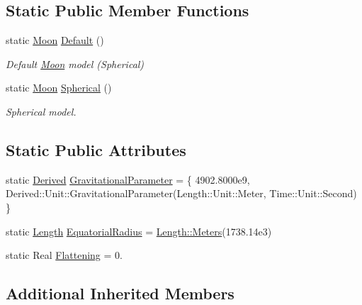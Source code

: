 \subsection*{Static Public Member Functions}
\begin{DoxyCompactItemize}
\item 
static \hyperlink{classostk_1_1physics_1_1env_1_1obj_1_1celest_1_1_moon}{Moon} \hyperlink{classostk_1_1physics_1_1env_1_1obj_1_1celest_1_1_moon_a20b7b36974130f942a113b05c4544a03}{Default} ()
\begin{DoxyCompactList}\small\item\em Default \hyperlink{classostk_1_1physics_1_1env_1_1obj_1_1celest_1_1_moon}{Moon} model (Spherical) \end{DoxyCompactList}\item 
static \hyperlink{classostk_1_1physics_1_1env_1_1obj_1_1celest_1_1_moon}{Moon} \hyperlink{classostk_1_1physics_1_1env_1_1obj_1_1celest_1_1_moon_a88731f2b1fde53140ce68d004f2a8aa9}{Spherical} ()
\begin{DoxyCompactList}\small\item\em Spherical model. \end{DoxyCompactList}\end{DoxyCompactItemize}
\subsection*{Static Public Attributes}
\begin{DoxyCompactItemize}
\item 
static \hyperlink{classostk_1_1physics_1_1units_1_1_derived}{Derived} \hyperlink{classostk_1_1physics_1_1env_1_1obj_1_1celest_1_1_moon_ad9b61b93eb0855dce7f969d68932f5c6}{Gravitational\+Parameter} = \{ 4902.\+8000e9, Derived\+::\+Unit\+::\+Gravitational\+Parameter(\+Length\+::\+Unit\+::\+Meter, Time\+::\+Unit\+::\+Second) \}
\item 
static \hyperlink{classostk_1_1physics_1_1units_1_1_length}{Length} \hyperlink{classostk_1_1physics_1_1env_1_1obj_1_1celest_1_1_moon_a955cccb5f9056296a10d4f7ea879e185}{Equatorial\+Radius} = \hyperlink{classostk_1_1physics_1_1units_1_1_length_ad227977ce00756791595796a0dd5ddd7}{Length\+::\+Meters}(1738.\+14e3)
\item 
static Real \hyperlink{classostk_1_1physics_1_1env_1_1obj_1_1celest_1_1_moon_ab66267b7075ad71aff5cbbe2469ef32c}{Flattening} = 0.
\end{DoxyCompactItemize}
\subsection*{Additional Inherited Members}


